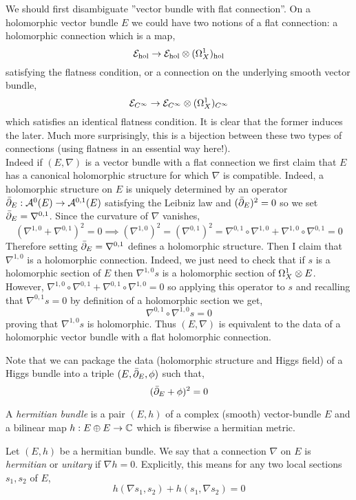\documentclass[12pt]{article}
\begin{document}
We should first disambiguate ''vector bundle with flat connection''. On a holomorphic vector bundle $E$ we could have two notions of a flat connection: a holomorphic connection which is a map,
\[ \mathcal{E}_{\mathrm{hol}} \to \mathcal{E}_{\mathrm{hol}} \otimes (\Omega^1_X)_{\mathrm{hol}} \]
satisfying the flatness condition,
or a connection on the underlying smooth vector bundle,
\[ \mathcal{E}_{C^{\infty}} \to \mathcal{E}_{C^{\infty}} \otimes (\Omega^1_X)_{C^{\infty}} \]
which satisfies an identical flatness condition. It is clear that the former induces the later. Much more surprisingly, this is a bijection between these two types of connections (using flatness in an essential way here!). 
\bigskip\\
Indeed if $(E, \nabla)$ is a vector bundle with a flat connection we first claim that $E$ has a canonical holomorphic structure for which $\nabla$ is compatible. Indeed, a holomorphic structure on $E$ is uniquely determined by an operator $\bar{\partial}_E : \mathcal{A}^0(E) \to \mathcal{A}^{0,1}(E)$ satisfying the Leibniz law and $(\bar{\partial}_E)^2 = 0$ so we set $\bar{\partial}_E = \nabla^{0,1}$. Since the curvature of $\nabla$ vanishes,
\[ (\nabla^{1,0} + \nabla^{0,1})^2 = 0 \implies (\nabla^{1,0})^2 = (\nabla^{0,1})^2 = \nabla^{0,1} \circ \nabla^{1,0} + \nabla^{1,0} \circ \nabla^{0,1} = 0 \] 
Therefore setting $\bar{\partial}_E = \nabla^{0,1}$ defines a holomorphic structure. Then I claim that $\nabla^{1,0}$ is a holomorphic connection. Indeed, we just need to check that if $s$ is a holomorphic section of $E$ then $\nabla^{1,0} s$ is a holomorphic section of $\Omega_X^1 \otimes E$. However, $\nabla^{1,0} \circ \nabla^{0,1} + \nabla^{0,1} \circ \nabla^{1,0} = 0$ so applying this operator to $s$ and recalling that $\nabla^{0,1} s = 0$ by definition of a holomorphic section we get,
\[ \nabla^{0,1} \circ \nabla^{1,0} s = 0 \]
proving that $\nabla^{1,0} s$ is holomorphic. Thus $(E, \nabla)$ is equivalent to the data of a holomorphic vector bundle with a flat holomorphic connection.

Note that we can package the data (holomorphic structure and Higgs field) of a Higgs bundle into a triple $(E, \bar{\partial}_E, \phi)$ such that,
\[ (\bar{\partial}_E + \phi)^2 = 0 \]

\begin{defn}
A \textit{hermitian bundle} is a pair $(E, h)$ of a complex (smooth) vector-bundle $E$ and a bilinear map $h : E \oplus E \to \mathbb{C}$ which is fiberwise a hermitian metric.
\end{defn}

\begin{defn}
Let $(E, h)$ be a hermitian bundle. We say that a connection $\nabla$ on $E$ is \textit{hermitian} or \textit{unitary} if $\nabla h = 0$. Explicitly, this means for any two local sections $s_1, s_2$ of $E$,
\[ h(\nabla s_1, s_2) + h(s_1, \nabla s_2) = 0 \] 
\end{defn}
\end{document}
